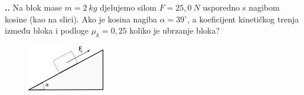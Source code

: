 

\noindent 
\textbf{
\thecjelina.\thezadatak.}
Na blok mase $m = 2\ kg$ djelujemo silom $F = 25,0\ N$
usporedno s nagibom kosine (kao na slici). Ako je kosina
nagiba $\alpha = 39^\circ$, a koeficijent kineti\v{c}kog trenja između
bloka i podloge $\mu_k = 0,25$ koliko je ubrzanje bloka?
\begin{figure}[ht]%
  \begin{center}
    \includegraphics[width=0.3\textwidth]{03_Dinamika_materijalne_tocke/kosina.png}
  \end{center}
\end{figure}

